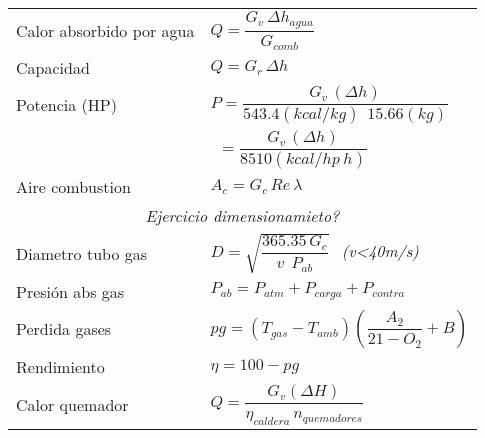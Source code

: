 \documentclass[11pt,a4paper]{article}
\begin{document}
\begin{cajita}
\begin{multicols}{2}
			\renewcommand{\arraystretch}{1.5}
		
			\begin{tabular}{p{} l}
				Calor absorbido por agua & $Q=\dfrac{G_v\,\Delta h_{agua}}{G_{comb}}$\\
				Capacidad  & $Q=G_{r} \, \Delta h$\\
				Potencia  (HP) & $P=\dfrac{G_{v}\,\left(\Delta h\right)}{543.4(kcal/kg)~~15.66(kg)}~~$\\
				&$~~=\dfrac{G_{v}\,\left(\Delta h\right)}{8510 (kcal/hp~h)}$\\[0.4cm]
				Aire combustion& $A_{c}=G_{c}\,Re\,\lambda$\\
				\multicolumn{2}{c}{\textsl{Ejercicio dimensionamieto?}}\\
				Diametro tubo gas & $D=\sqrt{\dfrac{365.35\,G_{c}}{v~~P_{ab}}}~~$ \textit{(v<40m/s)}\\
				Presión abs gas& $P_{ab}=P_{atm}+P_{carga}+P_{contra}$\\
				Perdida gases & $pg=(T_{gas}-T_{amb})\left(\dfrac{A_{2}}{21-O_{2}}+B\right)$\\
				Rendimiento  & $ \eta=100-pg$\\
				Calor quemador& $Q=\dfrac{G_{v}(\Delta H)}{\eta_{caldera} \, n_{quemadores}}$\\
			\end{tabular}
		\end{multicols}
	\end{cajita}
\end{document}
